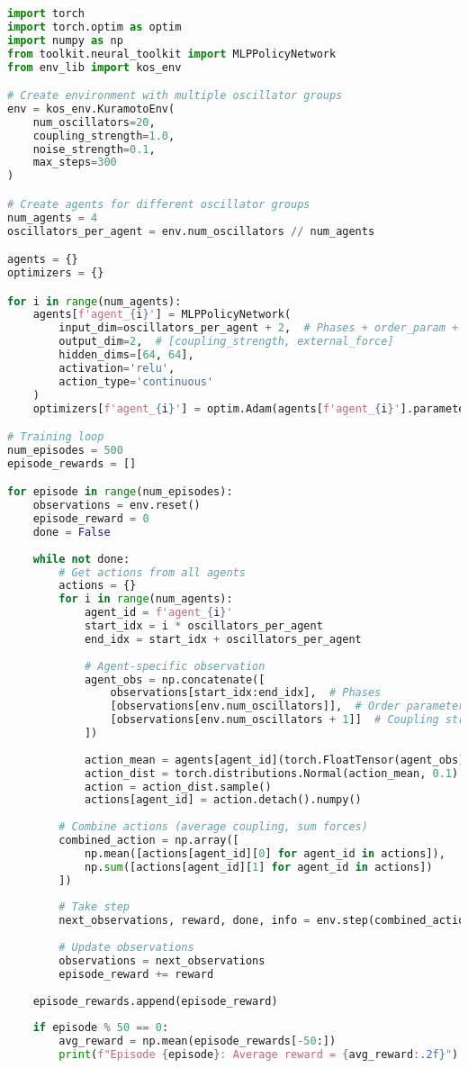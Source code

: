 \begin{lstlisting}[language=python, caption=Multi-Agent Control]
import torch
import torch.optim as optim
import numpy as np
from toolkit.neural_toolkit import MLPPolicyNetwork
from env_lib import kos_env

# Create environment with multiple oscillator groups
env = kos_env.KuramotoEnv(
    num_oscillators=20,
    coupling_strength=1.0,
    noise_strength=0.1,
    max_steps=300
)

# Create agents for different oscillator groups
num_agents = 4
oscillators_per_agent = env.num_oscillators // num_agents

agents = {}
optimizers = {}

for i in range(num_agents):
    agents[f'agent_{i}'] = MLPPolicyNetwork(
        input_dim=oscillators_per_agent + 2,  # Phases + order_param + coupling
        output_dim=2,  # [coupling_strength, external_force]
        hidden_dims=[64, 64],
        activation='relu',
        action_type='continuous'
    )
    optimizers[f'agent_{i}'] = optim.Adam(agents[f'agent_{i}'].parameters(), lr=0.001)

# Training loop
num_episodes = 500
episode_rewards = []

for episode in range(num_episodes):
    observations = env.reset()
    episode_reward = 0
    done = False
    
    while not done:
        # Get actions from all agents
        actions = {}
        for i in range(num_agents):
            agent_id = f'agent_{i}'
            start_idx = i * oscillators_per_agent
            end_idx = start_idx + oscillators_per_agent
            
            # Agent-specific observation
            agent_obs = np.concatenate([
                observations[start_idx:end_idx],  # Phases
                [observations[env.num_oscillators]],  # Order parameter
                [observations[env.num_oscillators + 1]]  # Coupling strength
            ])
            
            action_mean = agents[agent_id](torch.FloatTensor(agent_obs))
            action_dist = torch.distributions.Normal(action_mean, 0.1)
            action = action_dist.sample()
            actions[agent_id] = action.detach().numpy()
        
        # Combine actions (average coupling, sum forces)
        combined_action = np.array([
            np.mean([actions[agent_id][0] for agent_id in actions]),
            np.sum([actions[agent_id][1] for agent_id in actions])
        ])
        
        # Take step
        next_observations, reward, done, info = env.step(combined_action)
        
        # Update observations
        observations = next_observations
        episode_reward += reward
    
    episode_rewards.append(episode_reward)
    
    if episode % 50 == 0:
        avg_reward = np.mean(episode_rewards[-50:])
        print(f"Episode {episode}: Average reward = {avg_reward:.2f}")
\end{lstlisting}

